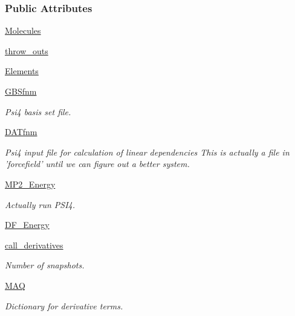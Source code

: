 \subsubsection*{\-Public \-Attributes}
\begin{DoxyCompactItemize}
\item 
\hyperlink{classforcebalance_1_1psi4io_1_1THCDF__Psi4_a31d20d660b88c3db08819660e27d6cd3}{\-Molecules}
\item 
\hyperlink{classforcebalance_1_1psi4io_1_1THCDF__Psi4_a8b28a1ea7d85acba8ca9fb5e9d5f2cd1}{throw\-\_\-outs}
\item 
\hyperlink{classforcebalance_1_1psi4io_1_1THCDF__Psi4_a6c5ab16e01d888c00283801bf7ec5a93}{\-Elements}
\item 
\hyperlink{classforcebalance_1_1psi4io_1_1THCDF__Psi4_aa072f1cf00629ad1ba88eee26a13d8e1}{\-G\-B\-Sfnm}
\begin{DoxyCompactList}\small\item\em \-Psi4 basis set file. \end{DoxyCompactList}\item 
\hyperlink{classforcebalance_1_1psi4io_1_1THCDF__Psi4_a25c973d669a48061482765bb057fa25b}{\-D\-A\-Tfnm}
\begin{DoxyCompactList}\small\item\em \-Psi4 input file for calculation of linear dependencies \-This is actually a file in 'forcefield' until we can figure out a better system. \end{DoxyCompactList}\item 
\hyperlink{classforcebalance_1_1psi4io_1_1THCDF__Psi4_a3e54ec0859872faa01e879e420770e6b}{\-M\-P2\-\_\-\-Energy}
\begin{DoxyCompactList}\small\item\em \-Actually run \-P\-S\-I4. \end{DoxyCompactList}\item 
\hyperlink{classforcebalance_1_1psi4io_1_1THCDF__Psi4_ab214bc03cb5cf110fc94c3c66b637b60}{\-D\-F\-\_\-\-Energy}
\item 
\hyperlink{classforcebalance_1_1leastsq_1_1LeastSquares_a667caf3a5471d9063ab400dcbb40a003}{call\-\_\-derivatives}
\begin{DoxyCompactList}\small\item\em \-Number of snapshots. \end{DoxyCompactList}\item 
\hyperlink{classforcebalance_1_1leastsq_1_1LeastSquares_afb0f39fe6182aa11a66645e6c5342412}{\-M\-A\-Q}
\begin{DoxyCompactList}\small\item\em \-Dictionary for derivative terms. \end{DoxyCompactList}\item 

\end{DoxyCompactItemize}
